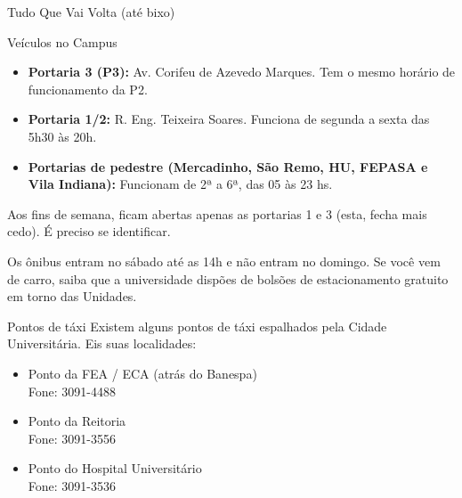 \begin{secao}{Tudo Que Vai Volta (até bixo)}
\begin{subsecao}{Veículos no Campus}
\begin{itemize}
  \item {\bf Portaria 3 (P3):} Av. Corifeu de Azevedo Marques. Tem o mesmo horário
    de funcionamento da P2.

  \item {\bf Portaria 1/2:} R. Eng. Teixeira Soares. Funciona de segunda a sexta das 5h30 às 20h. 
    
  \item {\bf Portarias de pedestre (Mercadinho, São Remo, HU, FEPASA e
      Vila Indiana):} Funcionam de 2ª a 6ª, das 05 às 23 hs.

\end{itemize}

Aos fins de semana, ficam abertas apenas as portarias 1 e 3 (esta, fecha mais cedo). É preciso se identificar.

Os ônibus entram no sábado até as 14h e não entram no domingo. Se você vem de carro, saiba que a universidade dispões de bolsões de estacionamento
gratuito em torno das Unidades.

\end{subsecao}

\begin{subsecao}{Pontos de táxi}
Existem alguns pontos de táxi espalhados pela Cidade Universitária. Eis suas
localidades:

\begin{itemize}
\item Ponto da FEA / ECA (atrás do Banespa)\\
Fone: 3091-4488

\item Ponto da Reitoria\\
Fone: 3091-3556

\item Ponto do Hospital Universitário\\
Fone: 3091-3536
\end{itemize}
\end{subsecao}


\end{secao}
